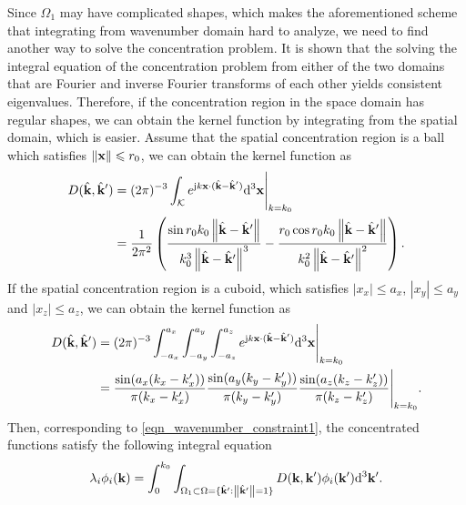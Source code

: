 \documentclass[12pt,draftclsnofoot,journal,onecolumn]{IEEEtran}
\begin{document}
	
Since ${\Omega}_1$ may have complicated shapes, which makes the aforementioned scheme that integrating from wavenumber domain hard to analyze, we need to find another way to solve the concentration problem. It is shown that the solving the integral equation of the concentration problem from either of the two domains that are Fourier and inverse Fourier transforms of each other yields consistent eigenvalues\cite{beylkin2007grids}. Therefore, if the concentration region in the space domain has regular shapes, we can obtain the kernel function by integrating from the spatial domain, which is easier. Assume that the spatial concentration region is a ball which satisfies $\left\| {\bf x} \right\|\leqslant r_0$, we can obtain the kernel function as
\begin{equation}
	\begin{aligned}
		D(\hat{\bf k},\hat{\bf k}') &= (2\pi)^{-3}\int_{\mathcal{K}} e^{{\rm j}k{\bf x}\cdot(\hat{\bf k}-\hat{\bf k}')}{\rm d}^3{\bf x}\Bigg|_{k=k_0} 
		\\&= \frac{1}{2\pi^2} \left( \frac{\sin r_0k_0\left\| \hat{\bf k}-\hat{\bf k}' \right\|}{k_0^3\left\| \hat{\bf k}-\hat{\bf k}' \right\|^3}-\frac{r_0\cos r_0k_0\left\| \hat{\bf k}-\hat{\bf k}' \right\|}{k_0^2\left\| \hat{\bf k}-\hat{\bf k}' \right\|^2} \right).
	\end{aligned}
\end{equation}
If the spatial concentration region is a cuboid, which satisfies $\left| x_x \right|\leqslant a_x$, $\left| x_y \right|\leqslant a_y$ and $\left| x_z \right|\leqslant a_z$, we can obtain the kernel function as
\begin{equation}
	\begin{aligned}
		D(\hat{\bf k},\hat{\bf k}') &= (2\pi)^{-3}\int_{-a_x}^{a_x}\int_{-a_y}^{a_y}\int_{-a_z}^{a_z} e^{{\rm j}k{\bf x}\cdot(\hat{\bf k}-\hat{\bf k}')}{\rm d}^3{\bf x}\Bigg|_{k=k_0}
		\\& = \frac{\sin(a_x(k_x-k_x'))}{\pi(k_x-k_x')}\frac{\sin(a_y(k_y-k_y'))}{\pi(k_y-k_y')}\frac{\sin(a_z(k_z-k_z'))}{\pi(k_z-k_z')}\Bigg|_{k=k_0}.
	\end{aligned}
\end{equation}
Then, corresponding to \eqref{eqn_wavenumber_constraint1}, the concentrated functions satisfy the following integral equation
\begin{equation}
	\lambda_i \phi_i({\bf k}) = \int_0^{k_0}\int_{{\Omega}_1 \subset {\Omega}=\{\hat{\bf k}': \left\| \hat{\bf k}' \right\|=1\}} D({\bf k},{\bf k}')\phi_i({\bf k}'){\rm d}^3{\bf k}'.
	\label{eqn_ball_wavenumber_constraint}
\end{equation}
\end{document}
